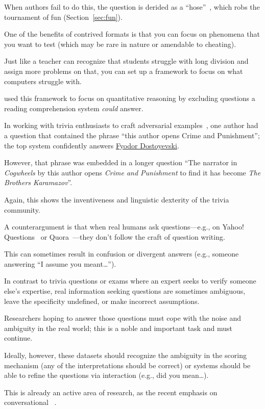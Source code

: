 When authors fail to do this, the question is derided as a ``hose''~\cite{2013-eltinge}, which robs the tournament of fun (Section~\ref{sec:fun}).

One of the benefits of contrived formats is that you can focus on phenomena that you want to test (which may be rare in nature or amendable to cheating). 

Just like a teacher can recognize that students struggle with long division and assign more problems on that, you can set up a framework to focus on what computers struggle with.

 used this framework to focus on quantitative reasoning by excluding questions a reading comprehension system \emph{could} answer.

In working with trivia enthusiasts to craft adversarial examples~\cite{wallace-19}, one author had a question that contained the phrase ``this author opens Crime and Punishment''; the top system confidently answers \underline{Fyodor Dostoyevski}.

However, that phrase was embedded in a longer question ``The narrator in \textit{Cogwheels} by this author opens \textit{Crime and Punishment} to find it has become \textit{The Brothers Karamazov}''. 

Again, this shows the inventiveness and linguistic dexterity of the trivia community.

A counterargument is that when real humans ask questions---e.g., on Yahoo! Questions~\cite{szpektor-13} or Quora~\cite{iyer-17}---they don't follow the craft of question writing.

This can sometimes result in confusion or divergent answers (e.g., someone answering ``I assume you meant\dots'').

In contrast to trivia questions or exams where an expert seeks to verify someone else's expertise, real information seeking questions  are sometimes ambiguous, leave the specificity undefined, or make incorrect assumptions.

Researchers hoping to answer those questions must cope with the noise and ambiguity in the real world; this is a noble and important task and must continue.

Ideally, however, these datasets should recognize the ambiguity in the scoring mechanism (any of the interpretations should be correct) or systems should be able to refine the questions via interaction (e.g., did you mean\dots).

This is already an active area of research, as the recent emphasis on conversational ~\cite{reddy-18,choi-18}.

